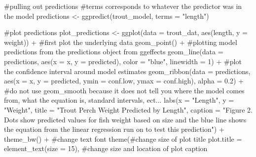 \documentclass[
  letterpaper,
  DIV=11,
  numbers=noendperiod]{scrartcl}
\newenvironment{Shaded}{\begin{snugshade}}{\end{snugshade}}
\newcommand{\AttributeTok}[1]{\textcolor[rgb]{0.40,0.45,0.13}{#1}}
\newcommand{\CommentTok}[1]{\textcolor[rgb]{0.37,0.37,0.37}{#1}}
\newcommand{\DecValTok}[1]{\textcolor[rgb]{0.68,0.00,0.00}{#1}}
\newcommand{\FloatTok}[1]{\textcolor[rgb]{0.68,0.00,0.00}{#1}}
\newcommand{\FunctionTok}[1]{\textcolor[rgb]{0.28,0.35,0.67}{#1}}
\newcommand{\NormalTok}[1]{\textcolor[rgb]{0.00,0.23,0.31}{#1}}
\newcommand{\OtherTok}[1]{\textcolor[rgb]{0.00,0.23,0.31}{#1}}
\newcommand{\SpecialCharTok}[1]{\textcolor[rgb]{0.37,0.37,0.37}{#1}}
\newcommand{\StringTok}[1]{\textcolor[rgb]{0.13,0.47,0.30}{#1}}
\begin{document}
\begin{Shaded}
\begin{Highlighting}[]
\CommentTok{\#pulling out predictions}
\CommentTok{\#terms corresponds to whatever the predictor was in the model }
\NormalTok{predictions }\OtherTok{\textless{}{-}} \FunctionTok{ggpredict}\NormalTok{(trout\_model, }\AttributeTok{terms =} \StringTok{"length"}\NormalTok{)}

\CommentTok{\#plot predictions }
\NormalTok{plot\_predictions }\OtherTok{\textless{}{-}} \FunctionTok{ggplot}\NormalTok{(}\AttributeTok{data =}\NormalTok{ trout\_dat, }\FunctionTok{aes}\NormalTok{(length, }\AttributeTok{y =}\NormalTok{ weight)) }\SpecialCharTok{+} 
  \CommentTok{\#first plot the underlying data }
  \FunctionTok{geom\_point}\NormalTok{() }\SpecialCharTok{+} 
  \CommentTok{\#plotting model predictions from the predictions object from ggeffects}
  \FunctionTok{geom\_line}\NormalTok{(}\AttributeTok{data =}\NormalTok{ predictions, }\FunctionTok{aes}\NormalTok{(}\AttributeTok{x =}\NormalTok{ x, }\AttributeTok{y =}\NormalTok{ predicted), }\AttributeTok{color =} \StringTok{"blue"}\NormalTok{, }\AttributeTok{linewidth =} \DecValTok{1}\NormalTok{) }\SpecialCharTok{+} 
  \CommentTok{\#plot the confidence interval around model estimates }
  \FunctionTok{geom\_ribbon}\NormalTok{(}\AttributeTok{data =}\NormalTok{ predictions, }\FunctionTok{aes}\NormalTok{(}\AttributeTok{x =}\NormalTok{ x, }\AttributeTok{y =}\NormalTok{ predicted, }\AttributeTok{ymin =}\NormalTok{ conf.low, }\AttributeTok{ymax =}\NormalTok{ conf.high), }\AttributeTok{alpha =} \FloatTok{0.2}\NormalTok{) }\SpecialCharTok{+} 
\CommentTok{\#do not use geom\_smooth because it does not tell you where the model comes from, what the equation is, standard intervals, ect...}
   \FunctionTok{labs}\NormalTok{(}\AttributeTok{x =} \StringTok{"Length"}\NormalTok{, }
        \AttributeTok{y =} \StringTok{"Weight"}\NormalTok{, }
        \AttributeTok{title =} \StringTok{"Trout Perch Weight Predicted by Length"}\NormalTok{, }
        \AttributeTok{caption =} \StringTok{"Figure 2. Dots show predicted values for fish weight based on size and the blue line shows the equation from the linear regression run on to test this prediction"}\NormalTok{) }\SpecialCharTok{+}
  \FunctionTok{theme\_bw}\NormalTok{() }\SpecialCharTok{+}
  \CommentTok{\#change text font}
  \FunctionTok{theme}\NormalTok{(}\CommentTok{\#change size of plot title }
        \AttributeTok{plot.title =} \FunctionTok{element\_text}\NormalTok{(}\AttributeTok{size =} \DecValTok{15}\NormalTok{),}
        \CommentTok{\#change size and location of plot caption}

\end{Highlighting}
\end{Shaded}
\end{document}
